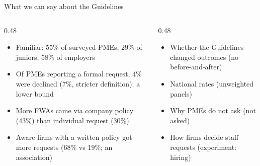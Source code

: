 \begin{frame}[t,label=B-tgfwar]{What we can say about the Guidelines}
  \FrameTop
  \begin{columns}[T,onlytextwidth]
    \begin{column}{0.48\textwidth}
      \begin{itemize}\setlength{\itemsep}{0.08cm}
        \item Familiar: 55\% of surveyed PMEs, 29\% of juniors, 58\% of employers
        \item Of PMEs reporting a formal request, 4\% were declined (7\%, stricter definition): a lower bound
        \item More FWAs came via company policy (43\%) than individual request (30\%)
        \item Aware firms with a written policy got more requests (68\% vs 19\%; an association)
      \end{itemize}
    \end{column}
    \begin{column}{0.48\textwidth}
      \begin{itemize}\setlength{\itemsep}{0.08cm}
        \item Whether the Guidelines changed outcomes (no before-and-after)
        \item National rates (unweighted panels)
        \item Why PMEs do not ask (not asked)
        \item How firms decide staff requests (experiment: hiring)
      \end{itemize}
    \end{column}
  \end{columns}
\end{frame}


